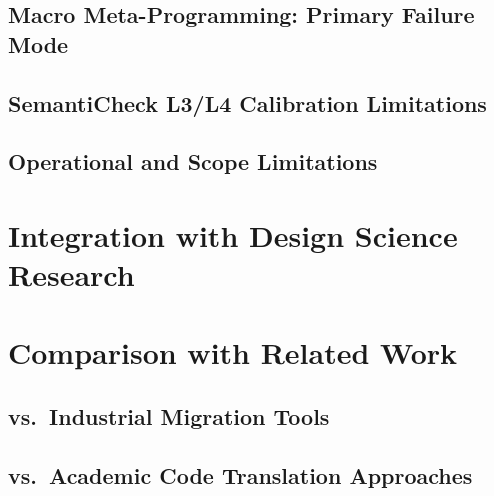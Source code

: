 \documentclass[12pt,a4paper]{report}
\begin{document}
  \subsection{Macro Meta-Programming: Primary Failure Mode}
  \label{subsec:limit-macros}

  \subsection{SemantiCheck L3/L4 Calibration Limitations}
  \label{subsec:limit-sc-calibration}

  \subsection{Operational and Scope Limitations}
  \label{subsec:limit-operational}

\section{Integration with Design Science Research}
\label{sec:dsr-integration}

\section{Comparison with Related Work}
\label{sec:comparison}

  \subsection{vs.\ Industrial Migration Tools}
  \label{subsec:vs-industrial}

  \subsection{vs.\ Academic Code Translation Approaches}
  \label{subsec:vs-academic}
\end{document}
